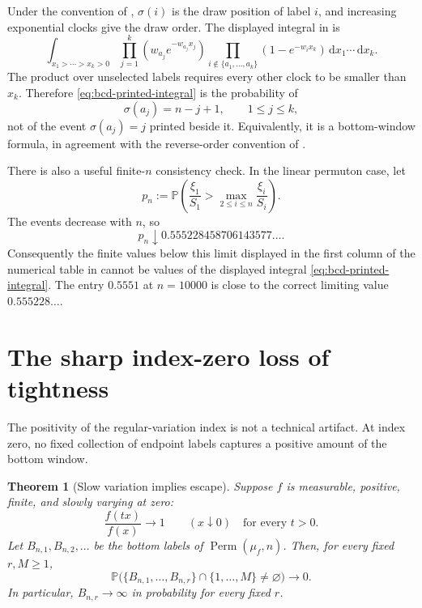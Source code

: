 \documentclass[11pt]{article}
\numberwithin{equation}{section}
\newtheorem{theorem}{Theorem}[section]
\theoremstyle{definition}
\theoremstyle{remark}
\newcommand{\Pp}{\mathbb P}
\newcommand{\Perm}{\operatorname{Perm}}
\newcommand{\dd}{\,\mathrm d}
\begin{document}
Under the convention of \cite{BCD}, $\sigma(i)$ is the draw position of label $i$, and increasing exponential clocks give the draw order.  The displayed integral in \cite[equation~(15) and Proposition~2.4]{BCD} is
\begin{equation}
  \int_{x_1>\cdots>x_k>0}
  \prod_{j=1}^k\left(w_{a_j}e^{-w_{a_j}x_j}\right)
  \prod_{i\notin\{a_1,\ldots,a_k\}}
  \left(1-e^{-w_i x_k}\right)
  \dd x_1\cdots\dd x_k.
  \label{eq:bcd-printed-integral}
\end{equation}
The product over unselected labels requires every other clock to be smaller than $x_k$.  Therefore \eqref{eq:bcd-printed-integral} is the probability of
\begin{equation}
  \sigma(a_j)=n-j+1,
  \qquad 1\leq j\leq k,
  \label{eq:correct-bcd-event}
\end{equation}
not of the event $\sigma(a_j)=j$ printed beside it.  Equivalently, it is a bottom-window formula, in agreement with the reverse-order convention of \cite[Theorem~4.2]{CDK}.

There is also a useful finite-$n$ consistency check.  In the linear permuton case, let
\[
  p_n:=\Pp\left(\frac{\xi_1}{S_1}>
  \max_{2\leq i\leq n}\frac{\xi_i}{S_i}\right).
\]
The events decrease with $n$, so
\begin{equation}
  p_n\downarrow0.555228458706143577\ldots.
  \label{eq:pn-monotone}
\end{equation}
Consequently the finite values below this limit displayed in the first column of the numerical table in \cite[Section~2.4]{BCD} cannot be values of the displayed integral \eqref{eq:bcd-printed-integral}.  The entry $0.5551$ at $n=10000$ is close to the correct limiting value $0.555228\ldots$.

\section{The sharp index-zero loss of tightness}
\label{sec:critical}

The positivity of the regular-variation index is not a technical artifact.  At index zero, no fixed collection of endpoint labels captures a positive amount of the bottom window.

\begin{theorem}[Slow variation implies escape]
\label{thm:gamma-zero}
Suppose $f$ is measurable, positive, finite, and slowly varying at zero:
\begin{equation}
  \frac{f(tx)}{f(x)}\longrightarrow1
  \qquad(x\downarrow0)
  \quad\text{for every }t>0.
  \label{eq:slow-variation}
\end{equation}
Let $B_{n,1},B_{n,2},\ldots$ be the bottom labels of $\Perm(\mu_f,n)$.  Then, for every fixed $r,M\geq1$,
\begin{equation}
  \Pp\bigl(\{B_{n,1},\ldots,B_{n,r}\}
  \cap\{1,\ldots,M\}\neq\varnothing\bigr)
  \longrightarrow0.
  \label{eq:window-escape}
\end{equation}
In particular, $B_{n,r}\to\infty$ in probability for every fixed $r$.
\end{theorem}
\end{document}
